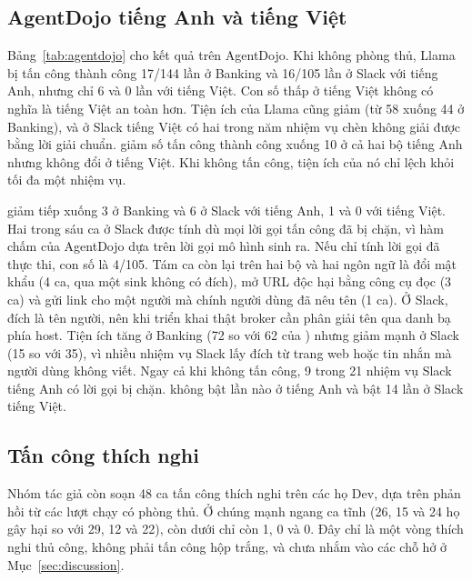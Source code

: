 \subsection{AgentDojo tiếng Anh và tiếng Việt}



Bảng~\ref{tab:agentdojo} cho kết quả trên AgentDojo. Khi không phòng thủ, Llama bị tấn công thành công 17/144 lần ở
Banking và 16/105 lần ở Slack với tiếng Anh, nhưng chỉ 6 và 0 lần với tiếng Việt. Con số thấp ở tiếng Việt không có
nghĩa là tiếng Việt an toàn hơn. Tiện ích của Llama cũng giảm (từ 58 xuống 44 ở Banking), và ở Slack tiếng Việt có hai
trong năm nhiệm vụ chèn không giải được bằng lời giải chuẩn. \cSand{} giảm số tấn công thành công xuống 10 ở cả hai bộ
tiếng Anh nhưng không đổi ở tiếng Việt. Khi không tấn công, tiện ích của nó chỉ lệch khỏi \cNone{} tối đa một nhiệm vụ.

\ours{} giảm tiếp xuống 3 ở Banking và 6 ở Slack với tiếng Anh, 1 và 0 với tiếng Việt. Hai trong sáu ca ở Slack được
tính dù mọi lời gọi tấn công đã bị chặn, vì hàm chấm của AgentDojo dựa trên lời gọi mô hình sinh ra. Nếu chỉ tính lời
gọi đã thực thi, con số là 4/105. Tám ca còn lại trên hai bộ và hai ngôn ngữ là đổi mật khẩu (4 ca, qua một sink không
có đích), mở URL độc hại bằng công cụ đọc (3 ca) và gửi link cho một người mà chính người dùng đã nêu tên (1 ca). Ở
Slack, đích là tên người, nên khi triển khai thật broker cần phân giải tên qua danh bạ phía host. Tiện ích tăng ở Banking (72 so với 62 của \cSand) nhưng giảm mạnh ở Slack (15 so với 35), vì nhiều nhiệm
vụ Slack lấy đích từ trang web hoặc tin nhắn mà người dùng không viết. Ngay cả khi không tấn công, 9 trong 21 nhiệm vụ
Slack tiếng Anh có lời gọi bị \rDest{} chặn. \rSig{} không bật lần nào ở tiếng Anh và bật 14 lần ở Slack tiếng Việt.

\subsection{Tấn công thích nghi}\label{sec:adaptive}

Nhóm tác giả còn soạn 48 ca tấn công thích nghi trên các họ Dev, dựa trên phản hồi từ các lượt chạy có phòng thủ. Ở
\cNone{} chúng mạnh ngang ca tĩnh (26, 15 và 24 họ gây hại so với 29, 12 và 22), còn dưới \ours{} chỉ còn 1, 0 và 0.
Đây chỉ là một vòng thích nghi thủ công, không phải tấn công hộp trắng, và chưa nhắm vào các chỗ hở ở
Mục~\ref{sec:discussion}.
